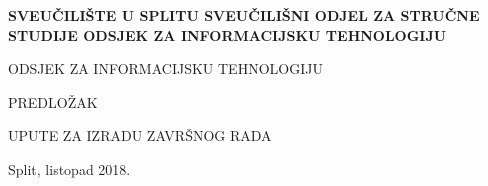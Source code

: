 %
%
\begin{titlepage}
\bfseries
\headerdata
{SVEUČILIŠTE U SPLITU}
{SVEUČILIŠNI ODJEL ZA STRUČNE STUDIJE}
{ODSJEK ZA INFORMACIJSKU TEHNOLOGIJU}

\vspace*{4cm}
\begin{center}
{\Large ODSJEK ZA INFORMACIJSKU TEHNOLOGIJU}

\vspace*{3cm}

{\large {PREDLOŽAK}}

\vspace*{0.5cm}
\Huge UPUTE ZA IZRADU ZAVRŠNOG RADA\\[1cm]

\end{center}
\begin{center}
\vfill
{\large Split, listopad 2018.}
\end{center}
\end{titlepage}
%
%
